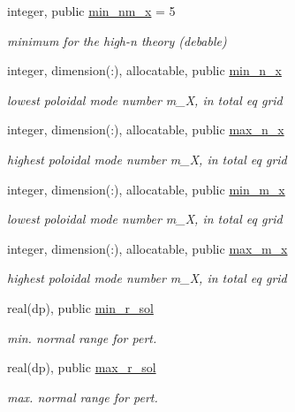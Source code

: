\begin{DoxyCompactItemize}
integer, public \hyperlink{namespacex__vars_adec89f548ba63e203297222dce675b94}{min\+\_\+nm\+\_\+x} = 5
\begin{DoxyCompactList}\small\item\em minimum for the high-\/n theory (debable) \end{DoxyCompactList}\item 
integer, dimension(\+:), allocatable, public \hyperlink{namespacex__vars_a07485e5ebf54c236ae6f3c25e9cd2a93}{min\+\_\+n\+\_\+x}
\begin{DoxyCompactList}\small\item\em lowest poloidal mode number {\ttfamily m\+\_\+X}, in total eq grid \end{DoxyCompactList}\item 
integer, dimension(\+:), allocatable, public \hyperlink{namespacex__vars_a2f04400f8c1489db3f2d66fa972852a5}{max\+\_\+n\+\_\+x}
\begin{DoxyCompactList}\small\item\em highest poloidal mode number {\ttfamily m\+\_\+X}, in total eq grid \end{DoxyCompactList}\item 
integer, dimension(\+:), allocatable, public \hyperlink{namespacex__vars_aae62c7b4f8043dcccad97454b5857690}{min\+\_\+m\+\_\+x}
\begin{DoxyCompactList}\small\item\em lowest poloidal mode number {\ttfamily m\+\_\+X}, in total eq grid \end{DoxyCompactList}\item 
integer, dimension(\+:), allocatable, public \hyperlink{namespacex__vars_aad66540f255243f66887442b9ef3c745}{max\+\_\+m\+\_\+x}
\begin{DoxyCompactList}\small\item\em highest poloidal mode number {\ttfamily m\+\_\+X}, in total eq grid \end{DoxyCompactList}\item 
real(dp), public \hyperlink{namespacex__vars_a50c610efcf5afa4ec4b0eb7119b5d520}{min\+\_\+r\+\_\+sol}
\begin{DoxyCompactList}\small\item\em min. normal range for pert. \end{DoxyCompactList}\item 
real(dp), public \hyperlink{namespacex__vars_a0f45dfddb928623424eeb8b8bdd2b0f9}{max\+\_\+r\+\_\+sol}
\begin{DoxyCompactList}\small\item\em max. normal range for pert. \end{DoxyCompactList}\item 

\end{DoxyCompactItemize}
